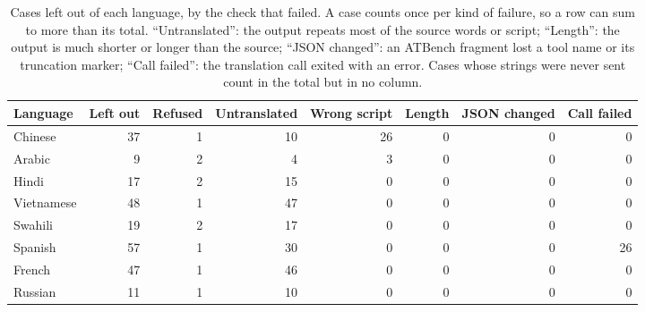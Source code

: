 \begin{table}[p]
\centering
\caption{Cases left out of each language, by the check that failed. A case counts once per kind of failure, so a row can sum to more than its total. ``Untranslated'': the output repeats most of the source words or script; ``Length'': the output is much shorter or longer than the source; ``JSON changed'': an ATBench fragment lost a tool name or its truncation marker; ``Call failed'': the translation call exited with an error. Cases whose strings were never sent count in the total but in no column.}
\label{tab:excluded}
\footnotesize
\setlength{\tabcolsep}{4pt}
\begin{tabular}{@{}lrrrrrrr@{}}
\toprule
Language & Left out & Refused & Untranslated & Wrong script & Length & JSON changed & Call failed \\
\midrule
Chinese & 37 & 1 & 10 & 26 & 0 & 0 & 0 \\
Arabic & 9 & 2 & 4 & 3 & 0 & 0 & 0 \\
Hindi & 17 & 2 & 15 & 0 & 0 & 0 & 0 \\
Vietnamese & 48 & 1 & 47 & 0 & 0 & 0 & 0 \\
Swahili & 19 & 2 & 17 & 0 & 0 & 0 & 0 \\
Spanish & 57 & 1 & 30 & 0 & 0 & 0 & 26 \\
French & 47 & 1 & 46 & 0 & 0 & 0 & 0 \\
Russian & 11 & 1 & 10 & 0 & 0 & 0 & 0 \\
\bottomrule
\end{tabular}
\end{table}
